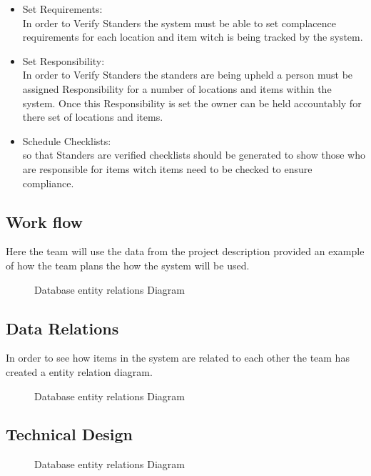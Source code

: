 \documentclass[Letter,11pt]{article}
\begin{document}
		\begin{itemize}
			\item Set Requirements:\\
			In order to Verify Standers the system must be able to set complacence requirements for each location and item witch is being tracked by the system.
			\item Set Responsibility:\\
			In order to Verify Standers the standers are being upheld a person must be assigned Responsibility for a number of locations and items within the system. Once this Responsibility is set the owner can be held accountably for there set of locations and items. 
			\item Schedule Checklists:\\
			so that Standers are verified  checklists should be generated to show those who are responsible for items witch items need to be checked to ensure compliance.
		\end{itemize}
		
	\subsection{Work flow}
		Here the team will use the data from the project description provided an example of how the team plans the how the system will be used.
		  
		\begin{figure}
			\centering
			
			\caption{\label{flow1} Database entity relations Diagram}
		\end{figure}
	\subsection{Data Relations}
		In order to see how items in the system are related to each other the team has created a entity relation diagram. 
		\begin{figure}[h]
			\centering
			
			\caption{\label{ERdiogram} Database entity relations Diagram}
		\end{figure}
	\subsection{Technical Design}
		
		\begin{figure}[h]
			\centering
			
			\caption{\label{sysConn} Database entity relations Diagram}
		\end{figure}
	
\end{document}
